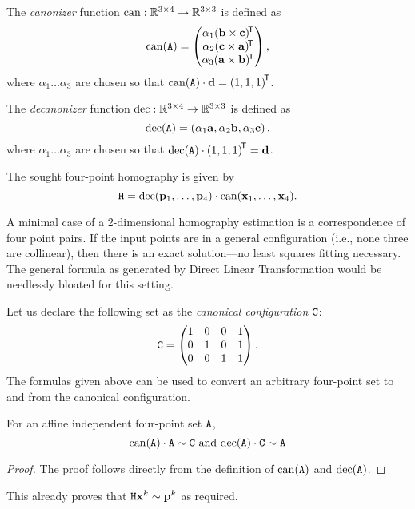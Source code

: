 \begin{definition}
The \textit{canonizer} function $\mathrm{can}: \mathbb{R}^{3\times 4} \to \mathbb{R}^{3\times 3}$ is defined as
$$\mathrm{can}(\mathtt{A}) = \begin{pmatrix}
 \alpha_1 (\mathbf{b} \times \mathbf{c}) ^{\!\mathsf{T}} \\
 \alpha_2 (\mathbf{c} \times \mathbf{a}) ^{\!\mathsf{T}} \\
 \alpha_3 (\mathbf{a} \times \mathbf{b}) ^{\!\mathsf{T}} \\
 \end{pmatrix},
$$
where $\alpha_1 \dots \alpha_3$ are chosen so that $\mathrm{can}(\mathtt{A}) \cdot \mathbf{d} = \left( 1, 1, 1 \right)^{\!\mathsf{T}}$.
\end{definition}

\begin{definition}
The \textit{decanonizer} function $\mathrm{dec}: \mathbb{R}^{3\times 4} \to \mathbb{R}^{3\times 3}$ is defined as
$$\mathrm{dec}(\mathtt{A}) = \left( \alpha_1 \mathbf{a}, \alpha_2 \mathbf{b}, \alpha_3 \mathbf{c} \right),$$
where $\alpha_1 \dots \alpha_3$ are chosen so that $\mathrm{dec}(\mathtt{A}) \cdot \left( 1, 1, 1 \right)^{\!\mathsf{T}} = \mathbf{d}$.
\end{definition}

The sought four-point homography is given by
\begin{equation} \label{e:algo-homo}
\mathtt{H} = \mathrm{dec}(\mathbf{p}_1, \dots, \mathbf{p}_4) \cdot \mathrm{can}(\mathbf{x}_1, \dots, \mathbf{x}_4).
\end{equation}

A minimal case of a 2-dimensional homography estimation is a correspondence of four point pairs.
If the input points are in a general configuration (i.e., none three are collinear), then there is an exact solution---no least squares fitting necessary.
The general formula as generated by Direct Linear Transformation would be needlessly bloated for this setting.

Let us declare the following set as the \textit{canonical configuration} $\mathtt{C}$:
$$\mathtt{C} = \begin{pmatrix}
 1 & 0 & 0 & 1 \\
 0 & 1 & 0 & 1 \\
 0 & 0 & 1 & 1
 \end{pmatrix}.$$
The formulas given above can be used to convert an arbitrary four-point set to and from the canonical configuration.

\begin{lemma}
For an affine independent four-point set $\mathtt{A}$,
$$\mathrm{can}(\mathtt{A}) \cdot \mathtt{A} \sim \mathtt{C} \textrm{ and } \mathrm{dec}(\mathtt{A}) \cdot \mathtt{C} \sim \mathtt{A}$$
\end{lemma}
\begin{proof}
The proof follows directly from the definition of $\mathrm{can}(\mathtt{A})$ and $\mathrm{dec}(\mathtt{A})$.
\end{proof}
This already proves that $\mathtt{H} \mathbf{x}^k \sim \mathbf{p}^k$ as required.

